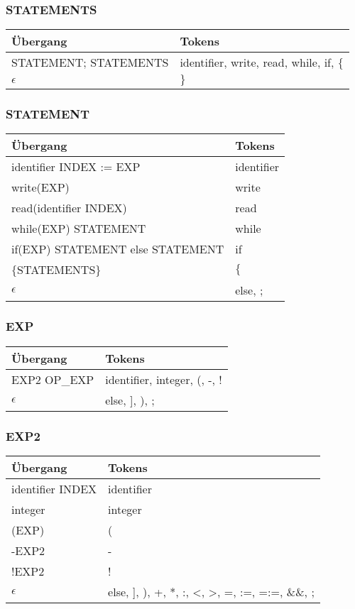 \documentclass[
a4paper,   %
11pt,      %
oneside,   %
onecolumn, %
final      %
]{article}
\begin{document}
\subsubsection{STATEMENTS}
\begin{tabular}{| l | l |}
	\hline
		\"Ubergang & Tokens \\
		\hline
		STATEMENT; STATEMENTS & identifier, write, read, while, if, $\{$ \\
		$\epsilon$ & $\}$ \\
	\hline
\end{tabular}
\newline

\subsubsection{STATEMENT}
\begin{tabular}{| l | l |}
	\hline
		\"Ubergang & Tokens \\
		\hline
		identifier INDEX := EXP & identifier \\
		write(EXP) & write \\
		read(identifier INDEX) & read \\
		while(EXP) STATEMENT & while \\
		if(EXP) STATEMENT else STATEMENT & if \\
		$\{$STATEMENTS$\}$ & $\{$ \\
		$\epsilon$ & else, ; \\
	\hline
\end{tabular}
\newline

\subsubsection{EXP}
\begin{tabular}{| l | l |}
	\hline
		\"Ubergang & Tokens \\
		\hline
		EXP2 OP\_EXP & identifier, integer, (, -, ! \\
		$\epsilon$ & else, ], ), ; \\
	\hline
\end{tabular}
\newline

\subsubsection{EXP2}
\begin{tabular}{| l | l |}
	\hline
		\"Ubergang & Tokens \\
		\hline
		identifier INDEX & identifier \\
		integer & integer \\
		(EXP) & ( \\
		-EXP2 & - \\
		!EXP2 & ! \\
		$\epsilon$ & else, ], ), +, *, :, <, >, =, :=, =:=, \&\&, ; \\
	\hline
\end{tabular}
\newline
\end{document}
